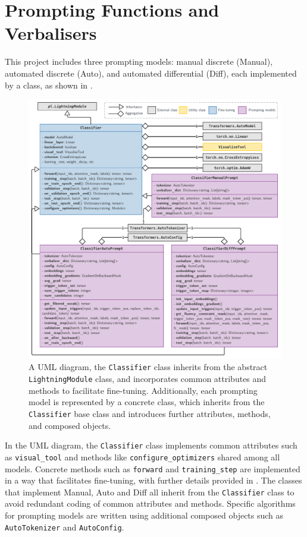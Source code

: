 \section{Prompting Functions and Verbalisers} \label{sec:prompting-models}
\vspace{-0.5em}
This project includes three prompting models: manual discrete (Manual), automated discrete (Auto), and automated differential (Diff), each implemented by a class, as shown in .
\vspace{-1em}
\begin{figure}[!ht]
    \centering
    \includegraphics[width=\hsize]{figures/implementation_media/impl-uml.pdf}
    \caption{A UML diagram, the \texttt{Classifier} class inherits from the abstract \texttt{LightningModule} class, and incorporates common attributes and methods to facilitate fine-tuning. Additionally, each prompting model is represented by a concrete class, which inherits from the \texttt{Classifier} base class and introduces further attributes, methods, and composed objects.}
    \label{fig:impl-uml}
\end{figure}

In the UML diagram, the \texttt{Classifier} class implements common attributes such as \texttt{visual\_tool} and methods like \texttt{configure\_optimizers} shared among all models. Concrete methods such as \texttt{forward} and \texttt{training\_step} are implemented in a way that facilitates fine-tuning, with further details provided in . The classes that implement Manual, Auto and Diff all inherit from the \texttt{Classifier} class to avoid redundant coding of common attributes and methods. Specific algorithms for prompting models are written using additional composed objects such as \texttt{AutoTokenizer} and \texttt{AutoConfig}.

